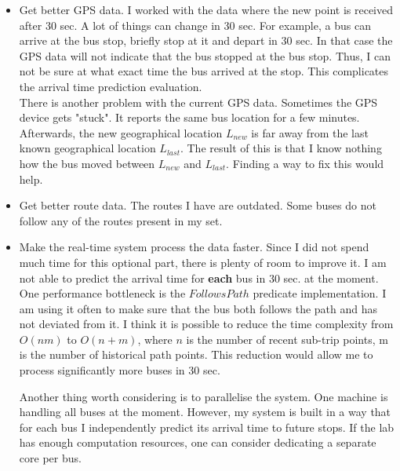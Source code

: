\documentclass[12pt,a4paper,oneside,openright]{report}
\begin{document}
\begin{itemize}

\item  Get better GPS data. I worked with the data where the new point is received after
       30 sec. A lot of things can change in 30 sec. For example, a bus can arrive at the bus
       stop, briefly stop at it and depart in 30 sec. In that case the GPS data will not
       indicate that the bus stopped at the bus stop. Thus, I can not be sure at what exact
       time the bus arrived at the stop. This complicates the arrival time
       prediction evaluation. \\

       There is another problem with the current GPS data. Sometimes the GPS device gets
       "stuck". It reports the same bus location for a few minutes. Afterwards, the new geographical
       location $L_{new}$ is far away from the last known geographical location $L_{last}$.
       The result of this is that I know nothing how the bus moved between $L_{new}$ and $L_{last}$.
       Finding a way to fix this would help.

\item  Get better route data. The routes I have are outdated. Some buses do not follow any
       of the routes present in my set.

\item  Make the real-time system process the data faster. Since I did not spend much time
       for this optional part, there is plenty of room to improve it. I am not able to
       predict the arrival time for \textbf{each} bus in 30 sec. at the moment. 
       One performance bottleneck is the $FollowsPath$ predicate implementation.
       I am using it often to make sure that the bus both follows the path and has not deviated
       from it. I think it is possible to reduce the time complexity from $O(nm)$ to $O(n + m)$,
       where $n$ is the number of recent sub-trip points, m is the number of historical path points.
       This reduction would allow me to process significantly more buses in 30 sec.

       Another thing worth considering is to parallelise the system. One machine is handling all buses
       at the moment. However, my system is built in
       a way that for each bus I independently predict its arrival time to future stops.
       If the lab has enough computation resources, one can consider
       dedicating a separate core per bus.

\end{itemize}
\end{document}
